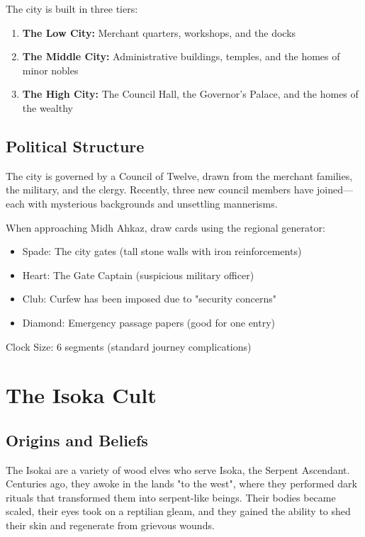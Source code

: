 \documentclass[12pt,twoside]{article}
\begin{document}
The city is built in three tiers:
\begin{enumerate}
  \item \textbf{The Low City:} Merchant quarters, workshops, and the docks
  \item \textbf{The Middle City:} Administrative buildings, temples, and the homes of minor nobles
  \item \textbf{The High City:} The Council Hall, the Governor's Palace, and the homes of the wealthy
\end{enumerate}

\subsection{Political Structure}

The city is governed by a Council of Twelve, drawn from the merchant families, the military, and the clergy. Recently, three new council members have joined—each with mysterious backgrounds and unsettling mannerisms.

When approaching Midh Ahkaz, draw cards using the regional generator:
\begin{itemize}
  \item Spade: The city gates (tall stone walls with iron reinforcements)
  \item Heart: The Gate Captain (suspicious military officer)
  \item Club: Curfew has been imposed due to "security concerns"
  \item Diamond: Emergency passage papers (good for one entry)
\end{itemize}
Clock Size: 6 segments (standard journey complications)

\section{The Isoka Cult}

\subsection{Origins and Beliefs}

The Isokai are a variety of wood elves who serve Isoka, the Serpent Ascendant. Centuries ago, they awoke in the lands "to the west", where they performed dark rituals that transformed them into serpent-like beings. Their bodies became scaled, their eyes took on a reptilian gleam, and they gained the ability to shed their skin and regenerate from grievous wounds.
\end{document}
